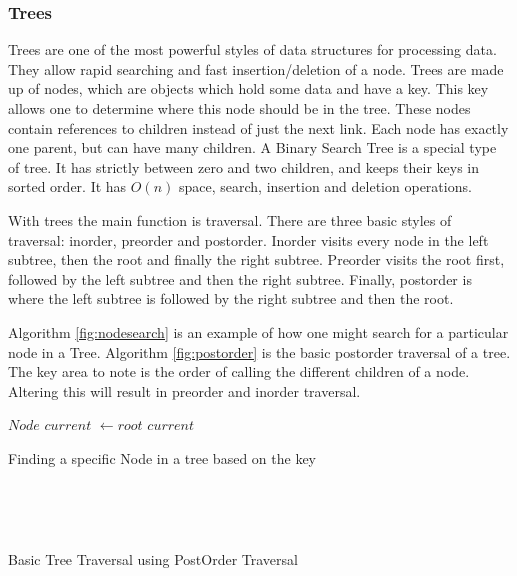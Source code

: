 \documentclass[conference]{IEEEtran}
\begin{document}
	\subsubsection{Trees}
	Trees are one of the most powerful styles of data structures for processing data. They allow rapid searching and fast insertion/deletion of a node. Trees are made up of nodes, which are objects which hold some data and have a key. This key allows one to determine where this node should be in the tree. These nodes contain references to children instead of just the next link. Each node has exactly one parent, but can have many children. A Binary Search Tree is a special type of tree. It has strictly between zero and two children, and keeps their keys in sorted order. It has $O(n)$ space, search, insertion and deletion operations. 
	\par With trees the main function is traversal. There are three basic styles of traversal: inorder, preorder and postorder. Inorder visits every node in the left subtree, then the root and finally the right subtree. Preorder visits the root first, followed by the left subtree and then the right subtree. Finally, postorder is where the left subtree is followed by the right subtree and then the root. 
\par Algorithm \ref{fig:nodesearch} is an example of how one might search for a particular node in a Tree. Algorithm \ref{fig:postorder} is the basic postorder traversal of a tree. The key area to note is the order of calling the different children of a node. Altering this will result in preorder and inorder traversal.
\IncMargin{1em}
\begin{algorithm}
	\LinesNumbered
	$Node$ $current$ $\longleftarrow root$\;
\Return $current$\;
\caption{Finding a specific Node in a tree based on the key}
\label{fig:nodesearch}
\end{algorithm}\DecMargin{1em}
\\
\IncMargin{1em}
\begin{algorithm}
\SetAlgoNoLine
\LinesNumbered
	\Indm{}\\
\caption{Basic Tree Traversal using PostOrder Traversal}
\label{fig:postorder}
\end{algorithm}\DecMargin{1em}
\end{document}
